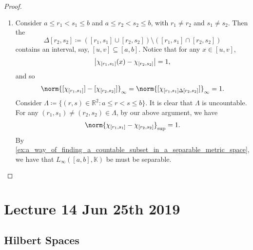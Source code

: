 \documentclass[notoc,notitlepage]{tufte-book}
\begin{document}
\begin{proof}
\begin{enumerate}
    \item Consider $a \leq r_1 < s_1 \leq b$ and $a \leq r_2 < s_2 \leq b$,
      with $r_1 \neq r_2$ and $s_1 \neq s_2$.
      Then the 
      \begin{equation*}
        [r_1, s_1] \Delta [r_2, s_2] \coloneqq
        ([r_1, s_1] \cup [r_2, s_2]) \setminus ([r_1, s_1] \cap [r_2, s_2])
      \end{equation*}
      contains an interval, say, $[u, v] \subseteq [a, b]$.
      Notice that for any $x \in [u, v]$,
      \begin{equation*}
        \left| \chi_{[r_1, s_1]}(x) - \chi_{[r_2, s_2]} \right| = 1,
      \end{equation*}
      and so
      \begin{equation*}
        \norm{[\chi_{[r_1, s_1]}] - [\chi_{[r_2, s_2]}]}_\infty =
        \norm{[\chi_{[r_1, s_1] \Delta [r_2, s_2]}]}_\infty = 1.
      \end{equation*}
      Consider
      $\Lambda \coloneqq \{ (r, s) \in \mathbb{R}^2 : a \leq r < s \leq b \}$.
      It is clear that $\Lambda$ is uncountable.
      For any $(r_1, s_1) \neq (r_2, s_2) \in \Lambda$, by our above argument,
      we have
      \begin{equation*}
        \norm{\chi_{[r_1, s_1]} - \chi_{[r_2, s_2]}}_{\sup} = 1.
      \end{equation*}
      By
      \cref{ex:a_way_of_finding_a_countable_subset_in_a_separable_metric_space},
      we have that $L_\infty([a, b], \mathbb{K})$ be must be separable.
  \end{enumerate}
\end{proof}



\chapter{Lecture 14 Jun 25th 2019}%
\label{chp:lecture_14_jun_25th_2019}

\section{Hilbert Spaces}%
\label{sec:hilbert_spaces}
\end{document}
